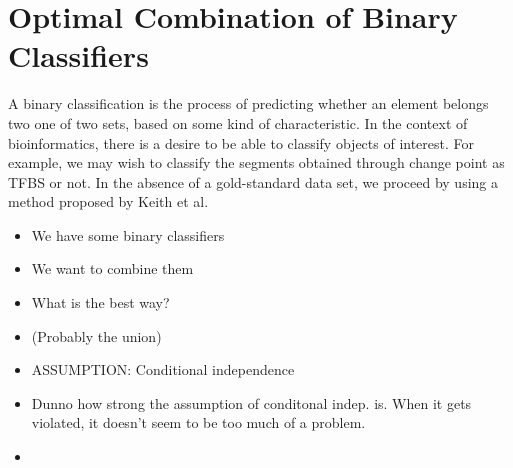 \section{Optimal Combination of Binary Classifiers}
    A binary classification is the process of predicting whether an element belongs two one of two sets, based on some kind of characteristic. In the context of bioinformatics, there is a desire to be able to classify objects of interest. For example, we may wish to classify the segments obtained through change point as TFBS or not. In the absence of a gold-standard data set, we proceed by using a method proposed by Keith et al. 
    \begin{itemize}
        \item We have some binary classifiers
        \item We want to combine them
        \item What is the best way?
        \item (Probably the union)
        \item ASSUMPTION: Conditional independence
        \item Dunno how strong the assumption of conditonal indep. is. When it gets violated, it doesn't seem to be too much of a problem.
        \item 
    \end{itemize}